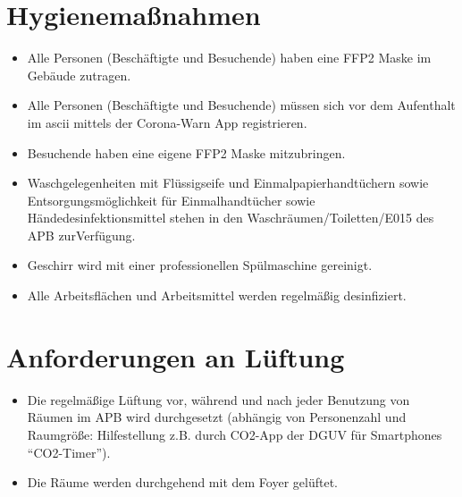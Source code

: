 \documentclass[12pt]{article}
\begin{document}
    \section{Hygienemaßnahmen}
        \begin{itemize}
            \item Alle Personen (Beschäftigte und Besuchende) haben eine FFP2 Maske im Gebäude zutragen.
            \item Alle Personen (Beschäftigte und Besuchende) müssen sich vor dem Aufenthalt im ascii mittels der Corona-Warn App registrieren.
            \item Besuchende haben eine eigene FFP2 Maske mitzubringen.
            \item Waschgelegenheiten mit Flüssigseife und Einmalpapierhandtüchern sowie Entsorgungsmöglichkeit für Einmalhandtücher sowie Hände\-des\-in\-fek\-tions\-mittel stehen in den Waschräumen/Toiletten/E015 des APB zurVerfügung.
            \item Geschirr wird mit einer professionellen Spülmaschine gereinigt.
            \item Alle Arbeitsflächen und Arbeitsmittel werden regelmäßig desinfiziert.
        \end{itemize}

    \section{Anforderungen an Lüftung}
        \begin{itemize}
            \item Die regelmäßige Lüftung vor, während und nach jeder Benutzung von Räumen im APB wird durchgesetzt (abhängig von Personenzahl und Raumgröße: Hilfestellung z.B. durch CO2-App der DGUV für Smartphones ``CO2-Timer'').
            \item Die Räume werden durchgehend mit dem Foyer gelüftet.
        \end{itemize}
\end{document}
